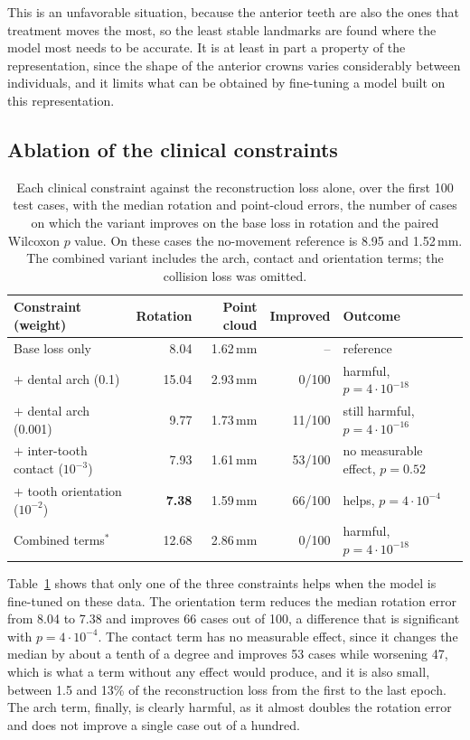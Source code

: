 \documentclass[10pt,a4paper]{article}
\begin{document}
This is an unfavorable situation, because the anterior teeth are also the ones that treatment moves the most, so the least stable landmarks are found where the model most needs to be accurate. It is at least in part a property of the representation, since the shape of the anterior crowns varies considerably between individuals, and it limits what can be obtained by fine-tuning a model built on this representation.

\subsection{Ablation of the clinical constraints}

\begin{table}[H]
\centering
\small
\begin{tabularx}{\textwidth}{@{}lrrr>{\raggedright\arraybackslash}X@{}}
\toprule
Constraint (weight) & Rotation & Point cloud & Improved & Outcome \\
\midrule
Base loss only                       & 8.04\degree{}           & 1.62\,mm & --      & reference \\
$+$ dental arch (0.1)                & 15.04\degree{}          & 2.93\,mm & 0/100   & harmful, $p = 4\cdot10^{-18}$ \\
$+$ dental arch (0.001)              & 9.77\degree{}           & 1.73\,mm & 11/100  & still harmful, $p = 4\cdot10^{-16}$ \\
$+$ inter-tooth contact ($10^{-3}$)  & 7.93\degree{}           & 1.61\,mm & 53/100  & no measurable effect, $p = 0.52$ \\
$+$ tooth orientation ($10^{-2}$)    & \textbf{7.38\degree{}}  & 1.59\,mm & 66/100  & helps, $p = 4\cdot10^{-4}$ \\
Combined terms$^{\ast}$              & 12.68\degree{}          & 2.86\,mm & 0/100   & harmful, $p=4\cdot10^{-18}$ \\
\bottomrule
\end{tabularx}
\caption{Each clinical constraint against the reconstruction loss alone, over the first 100 test cases, with the median rotation and point-cloud errors, the number of cases on which the variant improves on the base loss in rotation and the paired Wilcoxon $p$ value. On these cases the no-movement reference is 8.95\degree{} and 1.52\,mm. The combined variant includes the arch, contact and orientation terms; the collision loss was omitted.}
\label{tab:ablation}
\end{table}

Table~\ref{tab:ablation} shows that only one of the three constraints helps when the model is fine-tuned on these data. The orientation term reduces the median rotation error from 8.04\degree{} to 7.38\degree{} and improves 66 cases out of 100, a difference that is significant with $p = 4\cdot10^{-4}$. The contact term has no measurable effect, since it changes the median by about a tenth of a degree and improves 53 cases while worsening 47, which is what a term without any effect would produce, and it is also small, between 1.5 and 13\% of the reconstruction loss from the first to the last epoch. The arch term, finally, is clearly harmful, as it almost doubles the rotation error and does not improve a single case out of a hundred.
\end{document}
